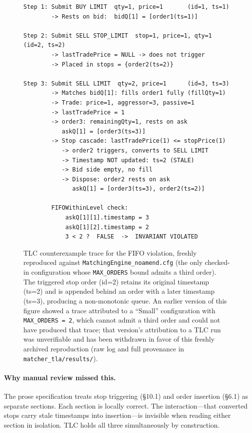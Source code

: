 \documentclass[11pt,a4paper]{article}
\begin{document}
\begin{figure}[H]
\centering
\begin{lstlisting}[language={},basicstyle=\ttfamily\footnotesize,frame=single,xleftmargin=0pt,framexleftmargin=0pt]
Step 1: Submit BUY LIMIT  qty=1, price=1       (id=1, ts=1)
        -> Rests on bid:  bidQ[1] = [order1(ts=1)]

Step 2: Submit SELL STOP_LIMIT  stop=1, price=1, qty=1  (id=2, ts=2)
        -> lastTradePrice = NULL -> does not trigger
        -> Placed in stops = {order2(ts=2)}

Step 3: Submit SELL LIMIT  qty=2, price=1      (id=3, ts=3)
        -> Matches bidQ[1]: fills order1 fully (fillQty=1)
        -> Trade: price=1, aggressor=3, passive=1
        -> lastTradePrice = 1
        -> order3: remainingQty=1, rests on ask
           askQ[1] = [order3(ts=3)]
        -> Stop cascade: lastTradePrice(1) <= stopPrice(1)
           -> order2 triggers, converts to SELL LIMIT
           -> Timestamp NOT updated: ts=2 (STALE)
           -> Bid side empty, no fill
           -> Dispose: order2 rests on ask
              askQ[1] = [order3(ts=3), order2(ts=2)]

        FIFOWithinLevel check:
            askQ[1][1].timestamp = 3
            askQ[1][2].timestamp = 2
            3 < 2 ?  FALSE  ->  INVARIANT VIOLATED
\end{lstlisting}
\caption{TLC counterexample trace for the FIFO violation, freshly
reproduced against \texttt{MatchingEngine\_noamend.cfg} (the only
checked-in configuration whose \texttt{MAX\_ORDERS} bound admits a
third order). The triggered stop order (id=2) retains its original
timestamp (ts=2) and is appended behind an order with a later timestamp
(ts=3), producing a non-monotonic queue. An earlier version of this
figure showed a trace attributed to a ``Small'' configuration with
\texttt{MAX\_ORDERS = 2}, which cannot admit a third order and could
not have produced that trace; that version's attribution to a TLC run
was unverifiable and has been withdrawn in favor of this freshly
archived reproduction (raw log and full provenance in
\texttt{matcher\_tla/results/}).}
\label{fig:trace}
\end{figure}

\paragraph{Why manual review missed this.} The prose specification
treats stop triggering (\S10.1) and order insertion (\S6.1) as separate
sections. Each section is locally correct. The interaction---that
converted stops carry stale timestamps into insertion---is invisible
when reading either section in isolation. TLC holds all three
simultaneously by construction.
\end{document}
